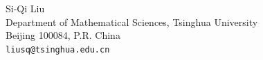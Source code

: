 \par
\vfill
\noindent
\begin{minipage}{\textwidth}
\small
\raggedright
Si-Qi Liu\\
Department of Mathematical Sciences, Tsinghua University\\
Beijing 100084, P.R. China\\
\texttt{liusq@tsinghua.edu.cn}
\end{minipage}
\par
